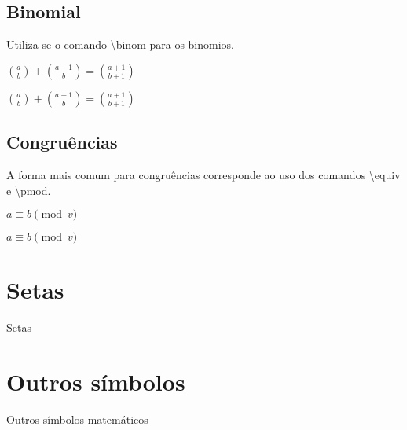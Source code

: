 \subsection{Binomial}
Utiliza-se o comando \textbackslash\textsf{binom} para os binomios. \\
\begin{minipage}[t]{0.47\linewidth} \vspace{-8pt}
    \begin{latexcode}
        $\binom{a}{b} + \binom{a+1}{b} = \binom{a+1}{b+1}$
    \end{latexcode}
\end{minipage} \hfill
\begin{minipage}[t]{0.47\linewidth} \vspace{0pt}
    $\binom{a}{b} + \binom{a+1}{b} = \binom{a+1}{b+1}$
\end{minipage}

\subsection{Congruências}
A forma mais comum para congruências corresponde ao uso dos comandos \textbackslash\textsf{equiv} e \textbackslash\textsf{pmod}. \\
\begin{minipage}[t]{0.47\linewidth} \vspace{-8pt}
    \begin{latexcode}
        $a \equiv b \pmod{v}$
    \end{latexcode}
\end{minipage} \hfill
\begin{minipage}[t]{0.47\linewidth} \vspace{0pt}
    $a \equiv b \pmod{v}$
\end{minipage}

\section{Setas}
\begin{table}[h!tb]
    \centering
    \caption{Setas}
    \label{tab:math_arrows}
    
\end{table}

\section{Outros símbolos}
\begin{table}[!htb]
    \centering
    \caption{Outros símbolos matemáticos}
    \label{tab:math_others}
    
\end{table}

